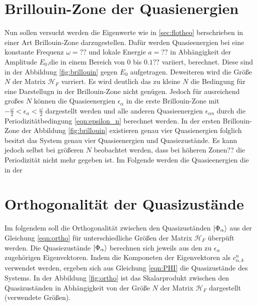 \section{Brillouin-Zone der Quasienergien}
Nun sollen versucht werden die Eigenwerte wie in \ref{sec:flotheo} berschrieben in einer Art Brillouin-Zone darzugestellen.
Dafür werden Quasieenergien bei eine konstante Frequenz $\omega=??$ und lokale Energie $a=??$ in Abhängigkeit der
Amplitude $E_0$,die in einem
Bereich von $0$ bis $0.1 ??$ variiert,  berechnet.
Diese sind in der Abbildung \ref{fig:brillouin} gegen $E_0$ aufgetragen.
Deweiteren wird die Größe $N$ der Matrix $\mathcal{H}_F$ varriert.
Es wird deutlich das zu kleine $N$ die Bedingung für eine Darstellugn in der Brillouin-Zone nicht genügen.
Jedoch für ausreichend großes $N$ können die Quasieenergien $\epsilon_\alpha$ in die erste Brillouin-Zone
mit $-\frac{\omega}{2}<\epsilon_\alpha<\frac{\omega}{2}$ dargestellt werden und
alle anderen Quasieenergien $\epsilon_{\alpha n}$ durch die Periodizitätbedingung \eqref{eqn:epsilon_n} berechnet werden.
In der ersten Brillouin-Zone der Abbildung \ref{fig:brillouin} existieren genau vier Quasienergien folglich besitzt das System
genau vier Quasieenergien und Quasiezustände.
Es kann jedoch selbst bei größeren $N$ beobachtet werden, dass bei höheren Zonen?? die Periodizität nicht mehr gegeben ist.
Im Folgende werden  die Quasieenergien die in der

\section{Orthogonalität der Quasizustände}
Im folgendem soll die Orthogonalität zwischen den Quasizuständen $\ket{\Phi_\alpha}$ aus der Gleichung \eqref{eqn:ortho} für
unterschiedliche Größen der Matrix $\mathcal{H}_F$ überpüft werden. Die Quasiezustände $\ket{\Phi_\alpha}$ berechnen sich jeweils aus
den zu $\epsilon_\alpha$ zugehörigen Eigenvektoren. Indem die Komponeten der Eigenvektoren als $c_{\alpha,k}^{n}$ verwendet werden,
ergeben sich aus Gleichung \eqref{eqn:PHI} die Quasizustände des Systems.
In der Abbildung \ref{fig:ortho} ist das Skalarprodukt zwischen den Quasizuständen in Abhängigkeit von der Größe $N$ der Matrix
$\mathcal{H}_F$ dargestellt (verwendete Größen).

